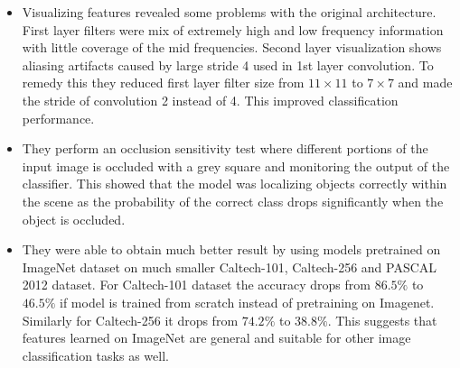 \documentclass{article}
\begin{document}
\begin{itemize}
    \item Visualizing features revealed some problems with the original architecture. First layer filters were mix of extremely high and low frequency information with little coverage of the mid frequencies. Second layer visualization shows aliasing artifacts caused by large stride 4 used in 1st layer convolution. To remedy this they reduced first layer filter size from $11\times 11$ to $7 \times 7$ and made the stride of convolution 2 instead of 4. This improved classification performance.  
    \item They perform an occlusion sensitivity test where different portions of the input image is occluded with a grey square and monitoring the output of the classifier. This showed that the model was localizing objects correctly within the scene as the probability of the correct class drops significantly when the object is occluded.
    \item They were able to obtain much better result by using models pretrained on ImageNet dataset on much smaller Caltech-101, Caltech-256 and PASCAL 2012 dataset. For Caltech-101 dataset the accuracy drops from $86.5\%$ to $46.5\%$ if model is trained from scratch instead of pretraining on Imagenet. Similarly for Caltech-256 it drops from $74.2\%$ to $38.8\%$. This suggests that features learned on ImageNet are general and suitable for other image classification tasks as well. 
\end{itemize}
\end{document}
